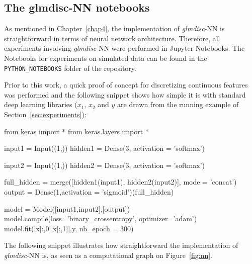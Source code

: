 \subsection{The glmdisc-NN notebooks} \label{app2:nn}

As mentioned in Chapter~\ref{chap4}, the implementation of \textit{glmdisc}-NN is straightforward in terms of neural network architecture. Therefore, all experiments involving \textit{glmdisc}-NN were performed in Jupyter Notebooks. The Notebooks for experiments on simulated data can be found in the \verb|PYTHON_NOTEBOOKS| folder of the repository.

Prior to this work, a quick proof of concept for discretizing continuous features was performed and the following snippet shows how simple it is with standard deep learning libraries ($x_1$, $x_2$ and $y$ are drawn from the running example of Section~\ref{sec:experiments}):

\begin{pylisting}
from keras import *
from keras.layers import *

input1 = Input((1,))
hidden1 = Dense(3, activation = 'softmax')

input2 = Input((1,))
hidden2 = Dense(3, activation = 'softmax')

full_hidden = merge([hidden1(input1), hidden2(input2)], mode = 'concat')
output = Dense(1,activation = 'sigmoid')(full_hidden)

model = Model([input1,input2],[output])
model.compile(loss='binary_crossentropy', optimizer='adam')
model.fit([x[:,0],x[:,1]],y, nb_epoch = 300)
\end{pylisting}


The following snippet illustrates how straightforward the implementation of \textit{glmdisc}-NN is, as seen as a computational graph on Figure~\ref{fig:nn}.

